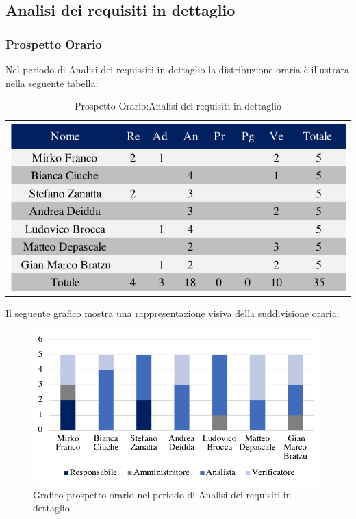 \newpage
\subsection{Analisi dei requisiti in dettaglio}
\subsubsection{Prospetto Orario}
Nel periodo di Analisi dei requissiti in dettaglio la distribuzione oraria è illustrara nella seguente tabella:
\begin{table}[!ht]
		\begin{center}
	\begin{tabular}{c}
	\includegraphics{images/tabellaProspettoOrarioDett.png}
\end{tabular}
	\caption{Prospetto Orario:Analisi dei requisiti in dettaglio}
	\end{center}
\end{table}

Il seguente grafico mostra una rappresentazione visiva della suddivisione oraria:
\begin{figure}[!ht]
		\begin{center}
	\includegraphics{images/grafoProspettoOrarioDett.png}
	\caption{Grafico prospetto orario nel periodo di Analisi dei requisiti in dettaglio}
	\end{center}
\end{figure}


